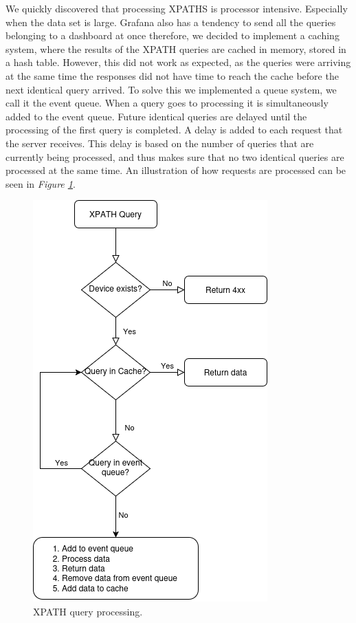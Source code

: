 \documentclass[12pt]{article}
\begin{document}
We quickly discovered that processing XPATHS is processor intensive. Especially when the data set is large.
Grafana also has a tendency to send all the queries belonging to a dashboard at once therefore, we decided 
to implement a caching system, where the results of the XPATH queries are cached in memory, stored in a hash table.
However, this did not work as expected, as the queries were arriving at the same time the responses did not 
have time to reach the cache before the next identical query arrived.
To solve this we implemented a queue system, we call it the event queue. 
When a query goes to processing it is simultaneously added to the event queue.
Future identical queries are delayed until the processing of the first query is completed.
A delay is added to each request that the server receives. This delay is based 
on the number of queries that are currently being processed, and thus makes
sure that no two identical queries are processed at the same time.
An illustration of how requests are processed can be seen in \textit{Figure \ref{fig:xpath-query}}.

\begin{figure}
  \centering
  \includegraphics{xpathquery.drawio.png}
  \caption{XPATH query processing.}
  \label{fig:xpath-query}
\end{figure}
\end{document}
